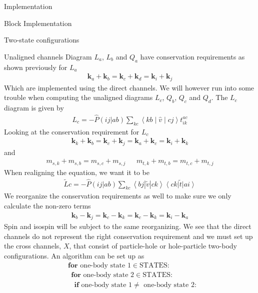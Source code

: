 \documentclass[twoside,english]{uiofysmaster}
\begin{document}
\begin{chapter}{Implementation}
\begin{section}{Block Implementation}
\begin{subsection}{Two-state configurations}
		\end{subsection}
		
		\begin{subsection}{Unaligned channels}
			Diagram $L_a$, $L_b$ and $Q_a$ have conservation requirements as shown previously for $L_a$
			\begin{align}
			 	\mathbf{k}_a + \mathbf{k}_b = \mathbf{k}_c + \mathbf{k}_d = \mathbf{k}_i + \mathbf{k}_j 
			\end{align}
			Which are implemented using the direct channels. We will however run into some trouble when computing the unaligned diagrams $L_c$, $Q_b$, $Q_c$ and $Q_d$. The $L_c$ diagram is given by 
			\begin{align}
				L_c = - \hat P(ij|ab) \sum_{kc} \left<kb\middle|\hat v\middle| cj \right> t_{ik}^{ac}
			\end{align}
			Looking at the conservation requirement for $L_c$
			\begin{align}
				\mathbf{k}_k + \mathbf{k}_b = \mathbf{k}_c + \mathbf{k}_j = \mathbf{k}_a + \mathbf{k}_c = \mathbf{k}_i + \mathbf{k}_k
			\end{align}
			and 
			\begin{align}
				m_{s,k} + m_{s,b} = m_{s,c} + m_{s,j}  \:\:\:\:\:\:\: m_{t,k} + m_{t,b} = m_{t,c} + m_{t,j} 
			\end{align}
			When realigning the equation, we want it to be
			\begin{align}
				\tilde Lc = -\hat P(ij|ab) \sum_{kc} \left<bj | \tilde v | ck \right> \left< ck \right| \tilde t \left| ai \right>
			\end{align}
			We reorganize the conservation requirements as well to make sure we only calculate the non-zero terms
			\begin{align}
				\mathbf{k}_b - \mathbf{k}_j = \mathbf{k}_c - \mathbf{k}_k = \mathbf{k}_c - \mathbf{k}_k = \mathbf{k}_i - \mathbf{k}_a
			\end{align}
			Spin and isospin will be subject to the same reorganizing. We see that the direct channels do not represent the right conservation requirement and we must set up the cross channels, $X$, that consist of particle-hole or hole-particle two-body configurations. An algorithm can be set up as
			\begin{align*}
				&\mathbf{for } \text{ one-body state 1} \in \text{STATES}:\\
				&\:\: \mathbf{for } \text{ one-body state 2} \in \text{STATES}:\\
				&\:\:\:\: \mathbf{if} \text{ one-body state 1} \neq \text{ one-body state 2}:\\

\end{align*}
\end{subsection}
\end{section}
\end{chapter}
\end{document}
